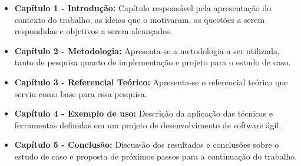 \begin{itemize}
    \item \textbf{Capítulo 1 - Introdução:} Capítulo responsável  pela apresentação do contexto do trabalho, as ideias que o motivaram, as questões a serem respondidas e objetivos a serem alcançados.
    \item \textbf{Capítulo 2 - Metodologia:} Apresenta-se a metodologia a ser utilizada, tanto de pesquisa quanto de implementação e projeto para o estudo de caso.
    \item \textbf{Capítulo 3 - Referencial Teórico:} Apresenta-se o referencial teórico que serviu como base para essa pesquisa.
    \item \textbf{Capítulo 4 - Exemplo de uso:} Descrição da aplicação das técnicas e ferramentas definidas em um projeto de desenvolvimento de software ágil.
    \item \textbf{Capítulo 5 - Conclusão:} Discussão dos resultados e conclusões sobre o estudo de caso e proposta de próximos passos para a continuação do trabalho.
\end{itemize}
